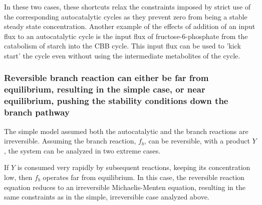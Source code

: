     \iftoggle{elifesubmission} {
  Interestingly, we find that in the two autocatalytic cycles shown in Figure \ref{fig:realautocatal}-figure supplements 1 and 2, reactions that generate direct input flux into the cycle exist.
  In the ribose-5P assimilating autocatalytic cycle (Figure \ref{fig:realautocatal}-figure supplement 1), the rpi reaction serves as a shortcut, allowing input flux directly from ribose-5P into the cycle.
  In the glycerone-phosphate assimilating cycle (Figure \ref{fig:realautocatal}-figure supplement 2), the tpi reaction similarly serves as such a shortcut.} {
  Interestingly, we find that in the two autocatalytic cycles shown in figures \ref{fig:extrasamps1} and \ref{fig:extrasamps2}, reactions that generate direct input flux into the cycle exist.
  In the ribose-5P assimilating autocatalytic cycle (Figure \ref{fig:extrasamps1}), the rpi reaction serves as a shortcut, allowing input flux directly from ribose-5P into the cycle.
  In the glycerone-phosphate assimilating cycle (Figure \ref{fig:extrasamps2}), the tpi reaction similarly serves as such a shortcut.}
  In these two cases, these shortcuts relax the constraints imposed by strict use of the corresponding autocatalytic cycles as they prevent zero from being a stable steady state concentration.
    Another example of the effects of addition of an input flux to an autocatalytic cycle is the input flux of fructose-6-phosphate from the catabolism of starch into the CBB cycle.
    This input flux can be used to 'kick start' the cycle even without using the intermediate metabolites of the cycle.

    
    \subsubsection{Reversible branch reaction can either be far from equilibrium, resulting in the simple case, or near equilibrium, pushing the stability conditions down the branch pathway}
    The simple model assumed both the autocatalytic and the branch reactions are irreversible.
    Assuming the branch reaction, $f_b$, can be reversible, with a product $Y$, the system can be analyzed in two extreme cases.

    If $Y$ is consumed very rapidly by subsequent reactions, keeping its concentration low, then $f_b$ operates far from equilibrium.
    In this case, the reversible reaction equation reduces to an irreversible Michaelis-Menten equation, resulting in the same constraints as in the simple, irreversible case analyzed above.

